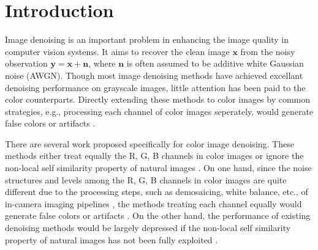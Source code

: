 \documentclass[10pt,twocolumn,letterpaper]{article}
\begin{document}
\section{Introduction}
Image denoising is an important problem in enhancing the image quality in computer vision systems. It aims to recover the clean image $\mathbf{x}$ from the noisy observation $\mathbf{y}=\mathbf{x}+\mathbf{n}$, where $\mathbf{n}$ is often assumed to be additive white Gaussian noise (AWGN). Though most image denoising methods \cite{nlm,bm3d,foe,ksvd,epll,lssc,ncsr,pgpd,wnnm,mlp,csf,chen2015learning} have achieved excellant denoising performance on grayscale images, little attention has been paid to the color counterparts. Directly extending these methods to color images by common strategies, e.g., processing each channel of color images seperately, would generate false colors or artifacts \cite{mairal2008sparse}.

There are several work  \cite{cbm3d,mairal2008sparse,almapg,noiseclinic,crosschannel2016,Zhu_2016_CVPR} proposed specifically for color image denoising. These methods either treat equally the R, G, B channels in color images \cite{cbm3d,mairal2008sparse,almapg} or ignore the non-local self similarity property of natural images \cite{noiseclinic,crosschannel2016,Zhu_2016_CVPR}. On one hand, since the noise structures and levels among the R, G, B channels in color images are quite different due to the processing steps, such as demosaicing, white balance, etc., of in-camera imaging pipelines \cite{karaimer_brown_ECCV_2016}, the methods treating each channel equally would generate false colors or artifacts \cite{mairal2008sparse}. On the other hand, the performance of existing denoising methods would be largely depressed if the non-local self similarity property of natural images has not been fully exploited \cite{wnnm}.
\end{document}
